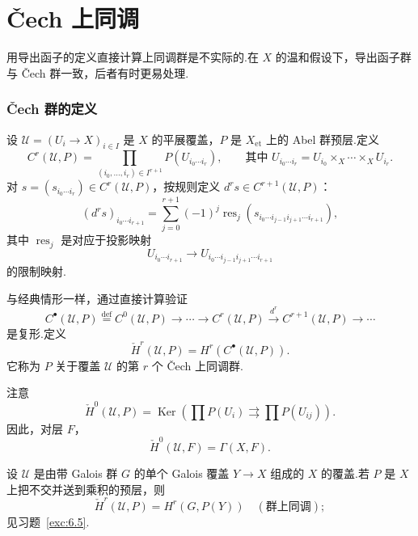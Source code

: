 ﻿%
\chapter{\v{C}ech 上同调}\label{sec:10}

用导出函子的定义直接计算上同调群是不实际的.在 $X$ 的温和假设下，导出函子群与 \v{C}ech 群一致，后者有时更易处理.

\subsection*{\v{C}ech 群的定义}

设 $\mathcal{U} = (U_i \to X)_{i \in I}$ 是 $X$ 的平展覆盖，$P$ 是 $X_{\mathrm{et}}$ 上的 Abel 群预层.定义
\[
C^{r}(\mathcal{U}, P) = \prod_{(i_0, \ldots, i_r) \in I^{r+1}} P(U_{i_0 \cdots i_r}), \qquad \text{其中 } U_{i_0 \cdots i_r} = U_{i_0} \times_{X} \cdots \times_{X} U_{i_r}.
\]
对 $s = (s_{i_0 \cdots i_r}) \in C^{r}(\mathcal{U}, P)$，按规则定义 $d^{r}s \in C^{r+1}(\mathcal{U}, P)$：
\[
(d^{r}s)_{i_0 \cdots i_{r+1}} = \sum_{j=0}^{r+1} (-1)^{j} \operatorname{res}_j(s_{i_0 \cdots i_{j-1} i_{j+1} \cdots i_{r+1}}),
\]
其中 $\operatorname{res}_j$ 是对应于投影映射
\[
U_{i_0 \cdots i_{r+1}} \to U_{i_0 \cdots i_{j-1} i_{j+1} \cdots i_{r+1}}
\]
的限制映射.

与经典情形一样，通过直接计算验证
\[
C^{\bullet}(\mathcal{U}, P) \overset{\mathrm{def}}{=} C^{0}(\mathcal{U}, P) \to \cdots \to C^{r}(\mathcal{U}, P) \xrightarrow{d^{r}} C^{r+1}(\mathcal{U}, P) \to \cdots
\]
是复形.定义
\[
\check{H}^{r}(\mathcal{U}, P) = H^{r}(C^{\bullet}(\mathcal{U}, P)).
\]
它称为 $P$ 关于覆盖 $\mathcal{U}$ 的第 $r$ 个 \v{C}ech 上同调群.

注意
\[
\check{H}^{0}(\mathcal{U}, P) = \operatorname{Ker}\left( \prod P(U_i) \rightrightarrows \prod P(U_{ij}) \right).
\]
因此，对层 $F$，
\[
\check{H}^{0}(\mathcal{U}, F) = \Gamma(X, F).
\]

\begin{example}\label{ex:10.1}
设 $\mathcal{U}$ 是由带 Galois 群 $G$ 的单个 Galois 覆盖 $Y \to X$ 组成的 $X$ 的覆盖.若 $P$ 是 $X$ 上把不交并送到乘积的预层，则
\[
\check{H}^{r}(\mathcal{U}, P) = H^{r}(G, P(Y)) \quad (\text{群上同调});
\]
见习题~\ref{exc:6.5}.
\end{example}

